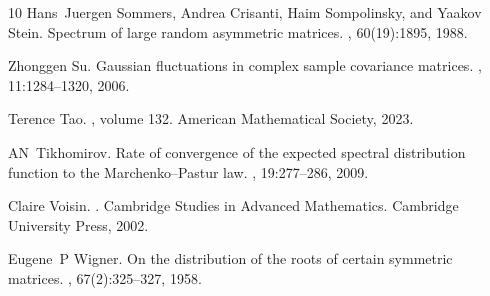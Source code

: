 \documentclass[11pt, a4paper, oneside]{book}
\numberwithin{equation}{chapter}
\begin{document}
\begin{thebibliography}{10}
Hans~Juergen Sommers, Andrea Crisanti, Haim Sompolinsky, and Yaakov Stein.
\newblock Spectrum of large random asymmetric matrices.
, 60(19):1895, 1988.

Zhonggen Su.
\newblock Gaussian fluctuations in complex sample covariance matrices.
, 11:1284--1320, 2006.

Terence Tao.
, volume 132.
\newblock American Mathematical Society, 2023.

AN~Tikhomirov.
\newblock Rate of convergence of the expected spectral distribution function to the {M}archenko--{P}astur law.
, 19:277--286, 2009.

Claire Voisin.
.
\newblock Cambridge Studies in Advanced Mathematics. Cambridge University Press, 2002.

Eugene~P Wigner.
\newblock On the distribution of the roots of certain symmetric matrices.
, 67(2):325--327, 1958.

\end{thebibliography}

\end{document}
